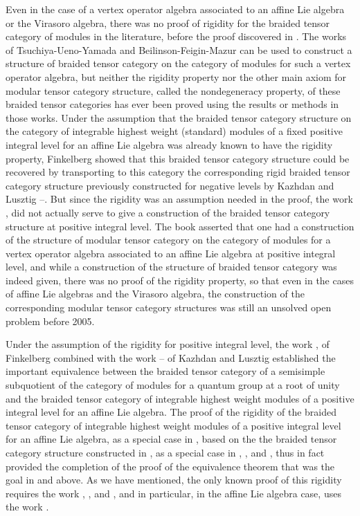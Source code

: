 \documentclass[12pt]{article}
\begin{document}
Even in the case of a vertex operator algebra associated to an affine
Lie algebra or the Virasoro algebra, there was no proof of rigidity
for the braided tensor category of modules in the literature, before
the proof discovered in \cite{rigidity}. The works of
Tsuchiya-Ueno-Yamada \cite{TUY} and Beilinson-Feigin-Mazur \cite{BFM}
can be used to construct a structure of braided tensor category on the
category of modules for such a vertex operator algebra, but neither
the rigidity property nor the other main axiom for modular tensor
category structure, called the
nondegeneracy property, of these braided tensor categories has ever
been proved using the results or methods in those works. Under the
assumption that the braided tensor category structure on the category
of integrable highest weight (standard) modules of a fixed positive
integral level for an affine Lie algebra was already known to have the
rigidity property, Finkelberg \cite{F1} \cite{F2} showed that this
braided tensor category structure could be recovered by transporting
to this category the corresponding rigid braided tensor category
structure previously constructed for negative levels by Kazhdan and
Lusztig \cite{KL1}--\cite{KL5}. But since the rigidity was an
assumption needed in the proof, the work \cite{F1}, \cite{F2} did not
actually serve to give a construction of the braided tensor category
structure at positive integral level.  The book \cite{BK} asserted
that one had a construction of the structure of modular tensor
category on the category of modules for a vertex operator algebra
associated to an affine Lie algebra at positive integral level, and
while a construction of the structure of braided tensor category was
indeed given, there was no proof of the rigidity property, so that
even in the cases of affine Lie algebras and the Virasoro algebra, the
construction of the corresponding modular tensor category structures
was still an unsolved open problem before 2005.

Under the assumption of the rigidity for positive integral level, the
work \cite{F1}, \cite{F2} of Finkelberg combined with the work
\cite{KL1}--\cite{KL5} of Kazhdan and Lusztig established the
important equivalence between the braided tensor category of a
semisimple subquotient of the category of modules for a quantum group
at a root of unity and the braided tensor category of integrable
highest weight modules of a positive integral level for an affine Lie
algebra. The proof of the rigidity of the braided tensor category of
integrable highest weight modules of a positive integral level for an
affine Lie algebra, as a special case in \cite{rigidity}, based on the
the braided tensor category structure constructed in \cite{HLaffine},
as a special case in \cite{tensor1}, \cite{tensor2}, \cite{tensor3}
and \cite{tensor4}, thus in fact provided the completion of the proof
of the equivalence theorem that was the goal in \cite{F1} and
\cite{F2} above. As we have mentioned, the only known proof of this
rigidity requires the work \cite{tensor1}, \cite{tensor2},
\cite{tensor3} and \cite{tensor4}, and in particular, in the affine
Lie algebra case, uses the work \cite{HLaffine}.
\end{document}
